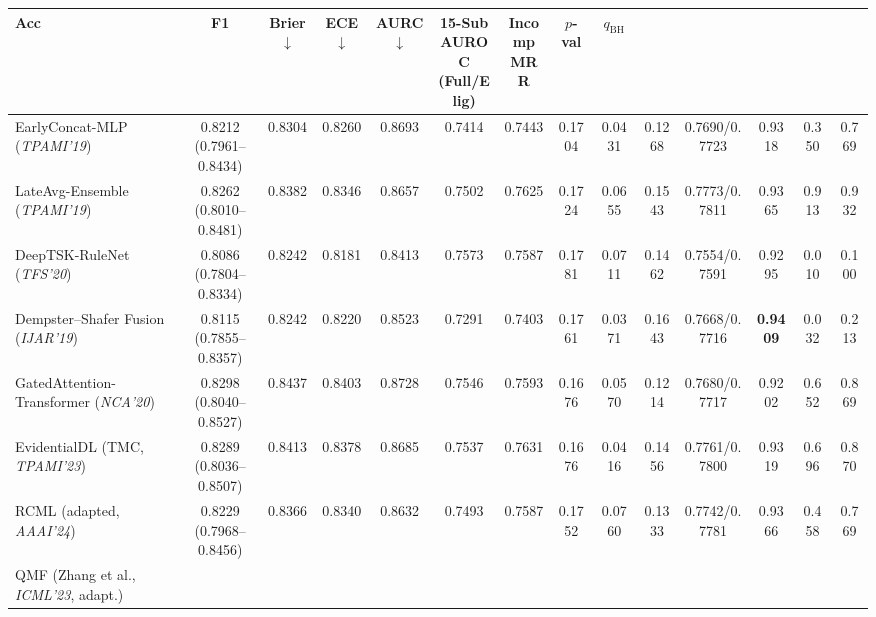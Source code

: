 \documentclass[10pt,twocolumn]{article}
\begin{document}
\begin{table}[t]
{\begin{tabular}{@{}>{\raggedright\arraybackslash}p{4.05cm}ccccccccccccc@{}}
\textbf{Acc} & \textbf{F1} & \textbf{Brier} $\downarrow$ & \textbf{ECE} $\downarrow$ &
\textbf{AURC} $\downarrow$ & \shortstack{\textbf{15-Sub}\\\textbf{AUROC}\\\textbf{(Full/Elig)}}
& \shortstack{\textbf{Incomp}\\\textbf{MRR}} & \textbf{$p$-val} & \textbf{$q_{\text{BH}}$} \\
\midrule
EarlyConcat-MLP (\textit{TPAMI'19}) \cite{baltrusaitis2018multimodal} &
\shortstack{0.8212\\(0.7961--0.8434)} & 0.8304 & 0.8260 & 0.8693 & 0.7414 & 0.7443 & 0.1704 &
0.0431 &
0.1268 & 0.7690/0.7723 & 0.9318 & 0.350 & 0.769 \\
LateAvg-Ensemble (\textit{TPAMI'19}) \cite{baltrusaitis2018multimodal} &
\shortstack{0.8262\\(0.8010--0.8481)} & 0.8382 & 0.8346 & 0.8657 & 0.7502 & 0.7625 & 0.1724 &
0.0655 &
0.1543 & 0.7773/0.7811 & 0.9365 & 0.913 & 0.932 \\
DeepTSK-RuleNet (\textit{TFS'20}) \cite{wu2020optimize} & \shortstack{0.8086\\(0.7804--0.8334)}
& 0.8242 & 0.8181 & 0.8413 & 0.7573 & 0.7587 & 0.1781 & 0.0711 & 0.1462 & 0.7554/0.7591 &
0.9295 & 0.010
& 0.100 \\
Dempster--Shafer Fusion (\textit{IJAR'19}) \cite{denoeux2019decision} &
\shortstack{0.8115\\(0.7855--0.8357)} & 0.8242 & 0.8220 & 0.8523 & 0.7291 & 0.7403 & 0.1761 &
0.0371 & 0.1643 & 0.7668/0.7716 & \textbf{0.9409} & 0.032 & 0.213 \\
GatedAttention-Transformer (\textit{NCA'20}) \cite{vaswani2017attention,arevalo2017gated} &
\shortstack{0.8298\\(0.8040--0.8527)} & 0.8437 & 0.8403 & 0.8728 & 0.7546 & 0.7593 & 0.1676 &
0.0570 &
0.1214 & 0.7680/0.7717 & 0.9202 & 0.652 & 0.869 \\
EvidentialDL (TMC, \textit{TPAMI'23}) \cite{han2022trusted} &
\shortstack{0.8289\\(0.8036--0.8507)} & 0.8413 & 0.8378 & 0.8685 & 0.7537 & 0.7631 & 0.1676 &
0.0416 &
0.1456 & 0.7761/0.7800 & 0.9319 & 0.696 & 0.870 \\
RCML (adapted, \textit{AAAI'24}) \cite{xu2024reliable} & \shortstack{0.8229\\(0.7968--0.8456)}
& 0.8366 & 0.8340 & 0.8632 & 0.7493 & 0.7587 & 0.1752 & 0.0760 & 0.1333 & 0.7742/0.7781 &
0.9366 & 0.458
& 0.769 \\
QMF (Zhang et al., \textit{ICML'23}, adapt.) \cite{zhang2023provable} &

\end{tabular}}
\end{table}
\end{document}
